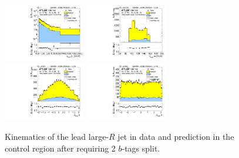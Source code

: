 \clearpage

\begin{figure}[htbp!]
\begin{center}
\includegraphics[width=0.32\textwidth,angle=-90]{figures/boosted/Control/b77_TwoTag_split_Control_leadHCand_Pt_m_1.pdf}
\includegraphics[width=0.32\textwidth,angle=-90]{figures/boosted/Control/b77_TwoTag_split_Control_leadHCand_Mass_s.pdf}\\
\includegraphics[width=0.32\textwidth,angle=-90]{figures/boosted/Control/b77_TwoTag_split_Control_leadHCand_Eta.pdf}
\includegraphics[width=0.32\textwidth,angle=-90]{figures/boosted/Control/b77_TwoTag_split_Control_leadHCand_Phi.pdf}
  \caption{Kinematics of the lead large-$R$ jet in data and prediction in the control region after requiring 2 $b$-tags split. }
  \label{fig:boosted-2bs-control-ak10-lead}
\end{center}
\end{figure}

